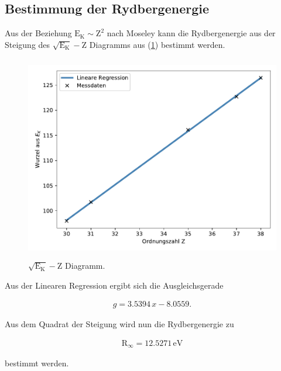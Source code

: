\subsection{Bestimmung der Rydbergenergie}    

\noindent
Aus der Beziehung $\text{E}_\text{K} \sim \text{Z}^2$ nach Moseley
 kann die Rydbergenergie aus der Steigung des $ \sqrt{\text{E}_\text{K}}-\text{Z}$ Diagramms aus (\ref{fig:mose}) bestimmt werden.

\begin{figure}
    \centering
       \includegraphics[height=9cm]{daten/mose.pdf}
       \caption{$\sqrt{\text{E}_\text{K}}-\text{Z}$ Diagramm.}
       \label{fig:mose}
\end{figure}

\noindent
Aus der Linearen Regression ergibt sich die Ausgleichsgerade

\begin{align*}
    g=3.5394\, x -8.0559.
\end{align*}

\noindent
Aus dem Quadrat der Steigung wird nun die Rydbergenergie zu 

\begin{align*}
    \text{R}_\infty =12.5271 \, \mathrm{eV}
\end{align*}

\noindent
bestimmt werden.

